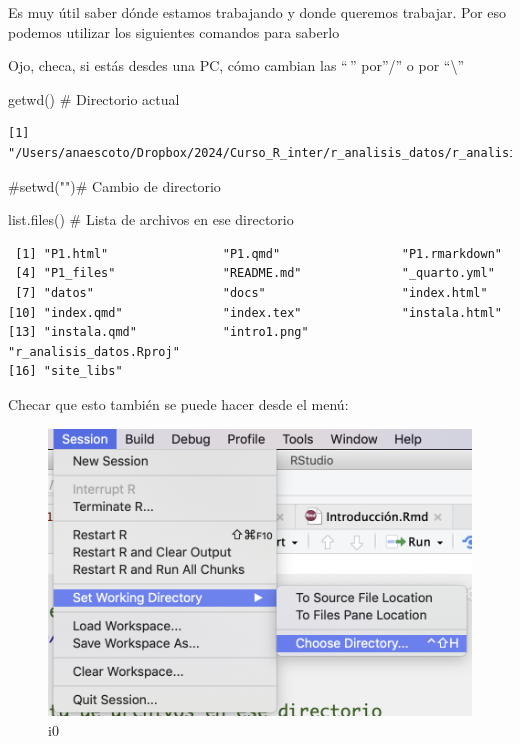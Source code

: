 \documentclass[
  letterpaper,
  DIV=11,
  numbers=noendperiod]{scrreprt}
\newenvironment{Shaded}{\begin{snugshade}}{\end{snugshade}}
\newcommand{\CommentTok}[1]{\textcolor[rgb]{0.37,0.37,0.37}{#1}}
\newcommand{\FunctionTok}[1]{\textcolor[rgb]{0.28,0.35,0.67}{#1}}
\newcommand{\NormalTok}[1]{\textcolor[rgb]{0.00,0.23,0.31}{#1}}
\begin{document}
Es muy útil saber dónde estamos trabajando y donde queremos trabajar.
Por eso podemos utilizar los siguientes comandos para saberlo

Ojo, checa, si estás desdes una PC, cómo cambian las ``\,'' por''/'' o
por ``\textbackslash{}''

\begin{Shaded}
\begin{Highlighting}[]
\FunctionTok{getwd}\NormalTok{()           }\CommentTok{\# Directorio actual}
\end{Highlighting}
\end{Shaded}

\begin{verbatim}
[1] "/Users/anaescoto/Dropbox/2024/Curso_R_inter/r_analisis_datos/r_analisis_datos"
\end{verbatim}

\begin{Shaded}
\begin{Highlighting}[]
\CommentTok{\#setwd("")\# Cambio de directorio}

\FunctionTok{list.files}\NormalTok{()      }\CommentTok{\# Lista de archivos en ese directorio}
\end{Highlighting}
\end{Shaded}

\begin{verbatim}
 [1] "P1.html"                "P1.qmd"                 "P1.rmarkdown"          
 [4] "P1_files"               "README.md"              "_quarto.yml"           
 [7] "datos"                  "docs"                   "index.html"            
[10] "index.qmd"              "index.tex"              "instala.html"          
[13] "instala.qmd"            "intro1.png"             "r_analisis_datos.Rproj"
[16] "site_libs"             
\end{verbatim}

Checar que esto también se puede hacer desde el menú:

\begin{figure}

{\centering \includegraphics{intro1.png}

}

\caption{i0}

\end{figure}
\end{document}
